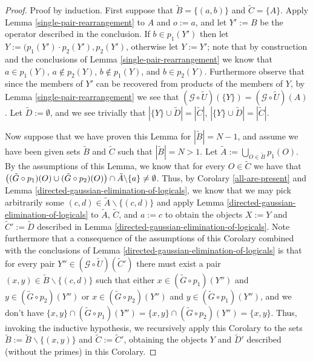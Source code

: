 \documentclass[twocolumn,showpacs,preprintnumbers,amsmath,amssymb,nofootinbib,pra,floatfix]{revtex4-1}
\newcommand{\set}{\tilde}
\newcommand{\genfun}{\mathcal{G}}
\begin{document}
\begin{proof}
Proof by induction.  First suppose that $\set B=\{(a,b)\}$ and $\set C=\{A\}$.  Apply Lemma \ref{single-pair-rearrangement} to $A$ and $o:=a$, and let $Y':=B$ be the operator described in the conclusion.  If $b\in p_1(Y')$ then let $Y:=(p_1(Y')\cdot p_2(Y'),p_2(Y')$, otherwise let $Y:=Y'$;  note that by construction and the conclusions of Lemma \ref{single-pair-rearrangement} we know that $a\in p_1(Y)$, $a\notin p_2(Y)$, $b\notin p_1(Y)$, and $b\in p_2(Y)$.  Furthermore observe that since the members of $Y'$ can be recovered from products of the members of $Y$, by Lemma \ref{single-pair-rearrangement} we see that $(\genfun\circ\set U)(\{Y\})=(\genfun\circ\set U)(A)$.  Let $\set D:=\emptyset$, and we see trivially that $|\{Y\}\cup \set D| = |\set C|$, $|\{Y\}\cup \set D| = |\set C|$.

Now suppose that we have proven this Lemma for $|\set B|=N-1$, and assume we have been given sets $\set B$ and $\set C$ such that $|\set B|=N>1$.  Let $\set A:=\bigcup_{O\in\set B} p_1(O)$.  By the assumptions of this Lemma, we know that for every $O\in\set C$ we have that $\paren{(\set G\circ p_1)(O) \cup (\set G\circ p_2)(O)} \cap \set A\backslash \{a\} \ne \emptyset$.  Thus, by Corolary \ref{all-are-present} and Lemma \ref{directed-gaussian-elimination-of-logicals}, we know that we may pick arbitrarily some $(c,d)\in\set A\backslash\{(c,d)\}$ and apply Lemma \ref{directed-gaussian-elimination-of-logicals} to $\set A$, $\set C$, and $a:=c$ to obtain the objects $X:=Y$ and $\set C':=\set D$ described in Lemma \ref{directed-gaussian-elimination-of-logicals}.  Note furthermore that a consequence of the assumptions of this Corolary combined with the conclusions of Lemma \ref{directed-gaussian-elimination-of-logicals} is that for every pair $Y''\in(\genfun\circ\set U)(\set C')$ there must exist a pair $(x,y)\in\set B\backslash\{(c,d)\}$ such that either $x\in (\set G\circ p_1)(Y'')$ and $y\in (\set G\circ p_2)(Y'')$ or $x\in (\set G\circ p_2)(Y'')$ and $y\in (\set G\circ p_1)(Y'')$, and we don't have $\{x,y\}\cap(\set G\circ p_1)(Y'')=\{x,y\}\cap(\set G\circ p_2)(Y'')=\{x,y\}$.  Thus, invoking the inductive hypothesis, we recursively apply this Corolary to the sets $\set B:=\set B\backslash\{(x,y)\}$ and $\set C:=\set C'$, obtaining the objects $Y$ and $\set D'$ described (without the primes) in this Corolary.


\end{proof}
\end{document}
